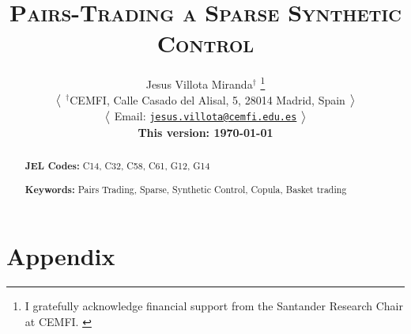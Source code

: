 \documentclass[12pt,a4paper]{article}
\title{\textsc{
\Large 
Pairs-Trading %
a Sparse Synthetic Control 
}
}
\author[1]{
{  
{\large Jesus Villota Miranda}$^{\dagger}$
\footnote{
\scriptsize{
I gratefully acknowledge financial support from the Santander Research Chair at CEMFI.
}
}
}

\bx 
{\small
$\big{<}$
\noindent $^{\dagger}$CEMFI, Calle Casado del Alisal, 5, 28014 Madrid, Spain 
$\big{>}$

$\big{<}$
Email: \href{mailto:jesus.villota@cemfi.edu.es}{\texttt{jesus.villota@cemfi.edu.es}}
$\big{>}$

\small \textbf{This version: \mydate\today}
}
}
\date{}
\begin{document}
\maketitle
\thispagestyle{empty}
\begin{abstract}
 

\bx 
\noindent\textbf{JEL Codes:} C14, C32, C58, C61, G12, G14

\mx 
\noindent\textbf{Keywords:} Pairs Trading, Sparse, Synthetic Control, Copula, Basket trading
\end{abstract}

\newpage
\setcounter{page}{1}



%












\newpage
\processdelayedfloats 
\renewcommand{\thefigure}{A\arabic{figure}} 
\renewcommand{\thetable}{A\arabic{table}}

\appendix
\newpage
\section{Appendix}

\end{document}
